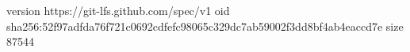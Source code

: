 version https://git-lfs.github.com/spec/v1
oid sha256:52f97adfda76f721c0692cdfefc98065c329dc7ab59002f3dd8bf4ab4eaccd7e
size 87544
